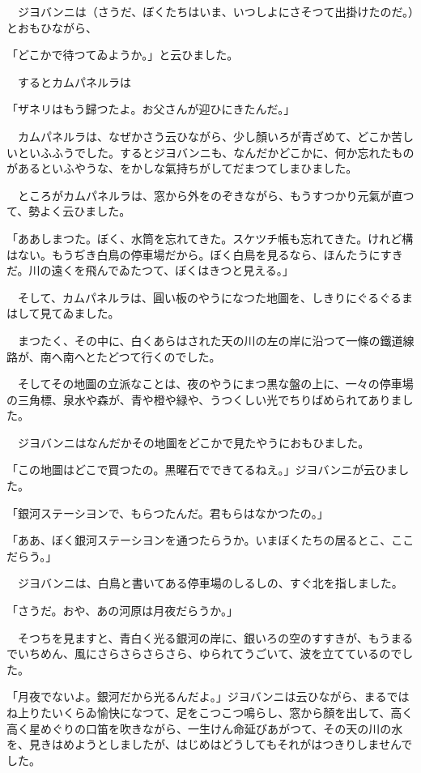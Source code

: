 \documentclass[tate,paper=b6j,jafontsize=9pt]{jlreq}
\begin{document}
　ジヨバンニは（さうだ、ぼくたちはいま、いつしよにさそつて出掛けたのだ。）とおもひながら、

「どこかで待つてゐようか。」と云ひました。

　するとカムパネルラは

「ザネリはもう歸つたよ。お父さんが迎ひにきたんだ。」

　カムパネルラは、なぜかさう云ひながら、少し顏いろが青ざめて、どこか苦しいといふふうでした。するとジヨバンニも、なんだかどこかに、何か忘れたものがあるといふやうな、をかしな氣持ちがしてだまつてしまひました。

　ところがカムパネルラは、窓から外をのぞきながら、もうすつかり元氣が直つて、勢よく云ひました。

「ああしまつた。ぼく、水筒を忘れてきた。スケツチ帳も忘れてきた。けれど構はない。もうぢき白鳥の停車場だから。ぼく白鳥を見るなら、ほんたうにすきだ。川の遠くを飛んでゐたつて、ぼくはきつと見える。」

　そして、カムパネルラは、圓い板のやうになつた地圖を、しきりにぐるぐるまはして見てゐました。

　まつたく、その中に、白くあらはされた天の川の左の岸に沿つて一條の鐵道線路が、南へ南へとたどつて行くのでした。

　そしてその地圖の立派なことは、夜のやうにまつ黒な盤の上に、一々の停車場の三角標、泉水や森が、青や橙や緑や、うつくしい光でちりばめられてありました。

　ジヨバンニはなんだかその地圖をどこかで見たやうにおもひました。

「この地圖はどこで買つたの。黒曜石でできてるねえ。」ジヨバンニが云ひました。

「銀河ステーシヨンで、もらつたんだ。君もらはなかつたの。」

「ああ、ぼく銀河ステーシヨンを通つたらうか。いまぼくたちの居るとこ、ここだらう。」

　ジヨバンニは、白鳥と書いてある停車場のしるしの、すぐ北を指しました。

「さうだ。おや、あの河原は月夜だらうか。」

　そつちを見ますと、青白く光る銀河の岸に、銀いろの空のすすきが、もうまるでいちめん、風にさらさらさらさら、ゆられてうごいて、波を立てているのでした。

「月夜でないよ。銀河だから光るんだよ。」ジヨバンニは云ひながら、まるではね上りたいくらゐ愉快になつて、足をこつこつ鳴らし、窓から顏を出して、高く高く星めぐりの口笛を吹きながら、一生けん命延びあがつて、その天の川の水を、見きはめようとしましたが、はじめはどうしてもそれがはつきりしませんでした。
\end{document}
